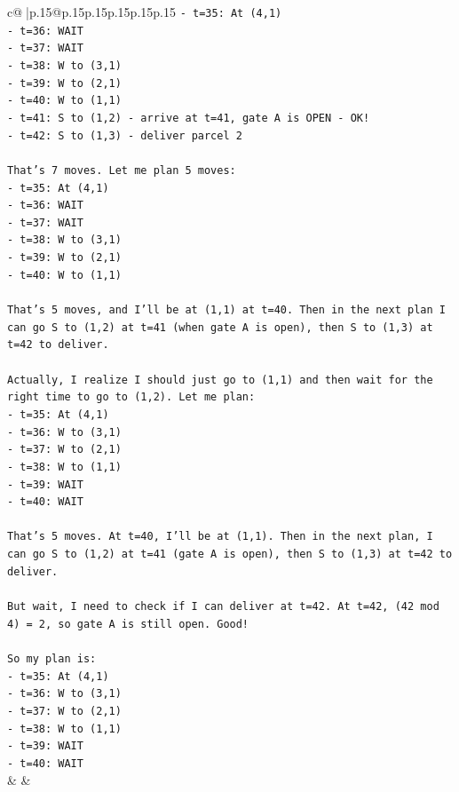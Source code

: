 \documentclass{article}
\begin{document}
{\begin{supertabular}{c@{$\;$}|p{.15\linewidth}@{}p{.15\linewidth}p{.15\linewidth}p{.15\linewidth}p{.15\linewidth}p{.15\linewidth}}
{{{\texttt{{-} t=35: At (4,1)} \\
\texttt{{-} t=36: WAIT} \\
\texttt{{-} t=37: WAIT} \\
\texttt{{-} t=38: W to (3,1)} \\
\texttt{{-} t=39: W to (2,1)} \\
\texttt{{-} t=40: W to (1,1)} \\
\texttt{{-} t=41: S to (1,2) {-} arrive at t=41, gate A is OPEN {-} OK!} \\
\texttt{{-} t=42: S to (1,3) {-} deliver parcel 2} \\
\\ 
\texttt{That's 7 moves. Let me plan 5 moves:} \\
\texttt{{-} t=35: At (4,1)} \\
\texttt{{-} t=36: WAIT} \\
\texttt{{-} t=37: WAIT} \\
\texttt{{-} t=38: W to (3,1)} \\
\texttt{{-} t=39: W to (2,1)} \\
\texttt{{-} t=40: W to (1,1)} \\
\\ 
\texttt{That's 5 moves, and I'll be at (1,1) at t=40. Then in the next plan I can go S to (1,2) at t=41 (when gate A is open), then S to (1,3) at t=42 to deliver.} \\
\\ 
\texttt{Actually, I realize I should just go to (1,1) and then wait for the right time to go to (1,2). Let me plan:} \\
\texttt{{-} t=35: At (4,1)} \\
\texttt{{-} t=36: W to (3,1)} \\
\texttt{{-} t=37: W to (2,1)} \\
\texttt{{-} t=38: W to (1,1)} \\
\texttt{{-} t=39: WAIT} \\
\texttt{{-} t=40: WAIT} \\
\\ 
\texttt{That's 5 moves. At t=40, I'll be at (1,1). Then in the next plan, I can go S to (1,2) at t=41 (gate A is open), then S to (1,3) at t=42 to deliver.} \\
\\ 
\texttt{But wait, I need to check if I can deliver at t=42. At t=42, (42 mod 4) = 2, so gate A is still open. Good!} \\
\\ 
\texttt{So my plan is:} \\
\texttt{{-} t=35: At (4,1)} \\
\texttt{{-} t=36: W to (3,1)} \\
\texttt{{-} t=37: W to (2,1)} \\
\texttt{{-} t=38: W to (1,1)} \\
\texttt{{-} t=39: WAIT} \\
\texttt{{-} t=40: WAIT} \\
            }
        }
    }
    & & \\ \\


\end{supertabular}}
\end{document}
